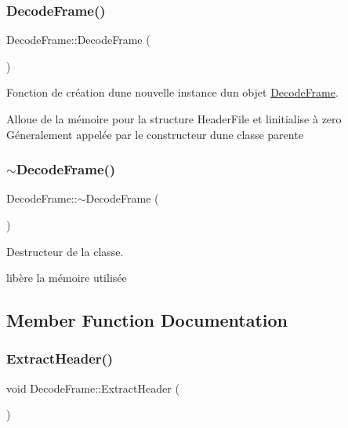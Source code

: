 \subsubsection{\texorpdfstring{Decode\+Frame()}{DecodeFrame()}\hspace{0.1cm}{\footnotesize\ttfamily [2/2]}}
{\footnotesize\ttfamily Decode\+Frame\+::\+Decode\+Frame (\begin{DoxyParamCaption}{ }\end{DoxyParamCaption})}



Fonction de création d\textquotesingle{}une nouvelle instance d\textquotesingle{}un objet \hyperlink{classDecodeFrame}{Decode\+Frame}. 

Alloue de la mémoire pour la structure Header\+File et l\textquotesingle{}initialise à zero ~\newline
 Géneralement appelée par le constructeur d\textquotesingle{}une classe parente \mbox{\label{classDecodeFrame_a150abde40a177b9b585c75d562516f2a}} 
\subsubsection{\texorpdfstring{$\sim$\+Decode\+Frame()}{~DecodeFrame()}}
{\footnotesize\ttfamily Decode\+Frame\+::$\sim$\+Decode\+Frame (\begin{DoxyParamCaption}{ }\end{DoxyParamCaption})}



Destructeur de la classe. 

libère la mémoire utilisée 

\subsection{Member Function Documentation}
\mbox{\label{classDecodeFrame_a7d3cb26d923ec22430687186a002c1a8}} 
\subsubsection{\texorpdfstring{Extract\+Header()}{ExtractHeader()}}
{\footnotesize\ttfamily void Decode\+Frame\+::\+Extract\+Header (\begin{DoxyParamCaption}{ }\end{DoxyParamCaption})}



